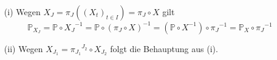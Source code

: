 \mbox{}
\begin{itemize}
\item[(i)] Wegen $X_{J} = \pi_{J}({(X_{t})}_{t\in I}) = \pi_{J} \circ X$ gilt 
\begin{equation*}
{\mathbb{P}}_{X_{J}} = \mathbb{P} \circ {X_{J}}^{-1} = \mathbb{P} \circ {(\pi_{J} \circ X)}^{-1} = (\mathbb{P} \circ X^{-1}) \circ {\pi_{J}}^{-1} = \mathbb{P}_{X} \circ {\pi_{J}}^{-1} 
\end{equation*}

\item[(ii)] Wegen $X_{J_{1}} = {\pi_{J_{1}}}^{J_{2}} \circ X_{J_{2}}$ folgt die Behauptung aus (i).

\end{itemize}